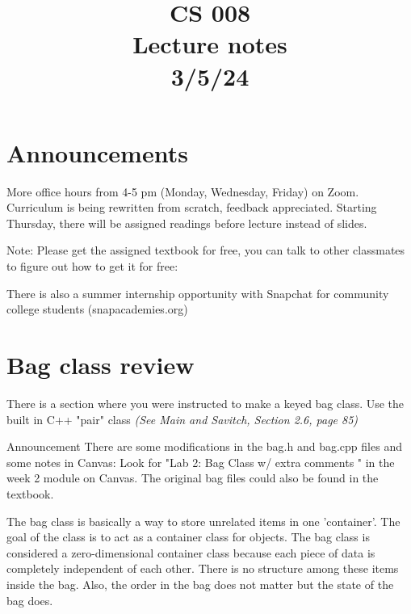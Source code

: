 \documentclass[11pt,a4paper,english]{paper}
\begin{document}
\title{CS 008 \\ Lecture notes \\ 3/5/24}
\maketitle

\section{Announcements}

More office hours from 4-5 pm (Monday, Wednesday, Friday) on Zoom. Curriculum is being rewritten from scratch, feedback appreciated. Starting Thursday, there will be assigned readings before lecture instead of slides.

\bigskip

\begin{mybox}{Note:} {
Please get the assigned textbook for free, you can talk to other classmates to figure out how to get it for free:
}
\end{mybox}

\bigskip

\noindent There is also a summer internship opportunity with Snapchat for community college students (snapacademies.org)

\section{Bag class review}

There is a section where you were instructed to make a keyed bag class. Use the built in C++ "pair" class \textit{(See Main and Savitch, Section 2.6, page 85)}

\bigskip
\begin{bluebox}{Announcement} {
There are some modifications in the bag.h  and bag.cpp files and some notes in Canvas: Look for "Lab 2: Bag Class w/ extra comments " in the week 2 module on Canvas. The original bag files could also be found in the textbook.
}
\end{bluebox}
\bigskip
The bag class is basically a way to store unrelated items in one 'container'. The goal of the class is to act as a container class for objects. The bag class is considered a zero-dimensional container class because each piece of data is completely independent of each other. There is no structure among these items inside the bag. Also, the order in the bag does not matter but the state of the bag does.
\bigskip
\end{document}
